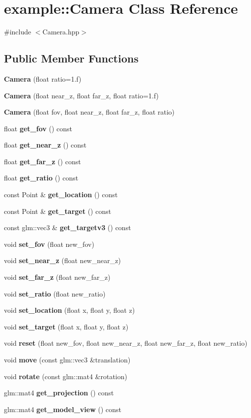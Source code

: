 \section{example\+::Camera Class Reference}
\label{classexample_1_1_camera}


{\ttfamily \#include $<$Camera.\+hpp$>$}

\subsection*{Public Member Functions}
\begin{DoxyCompactItemize}
\item 
\textbf{ Camera} (float ratio=1.f)
\item 
\textbf{ Camera} (float near\+\_\+z, float far\+\_\+z, float ratio=1.f)
\item 
\textbf{ Camera} (float fov, float near\+\_\+z, float far\+\_\+z, float ratio)
\item 
float \textbf{ get\+\_\+fov} () const
\item 
float \textbf{ get\+\_\+near\+\_\+z} () const
\item 
float \textbf{ get\+\_\+far\+\_\+z} () const
\item 
float \textbf{ get\+\_\+ratio} () const
\item 
const Point \& \textbf{ get\+\_\+location} () const
\item 
const Point \& \textbf{ get\+\_\+target} () const
\item 
const glm\+::vec3 \& \textbf{ get\+\_\+targetv3} () const
\item 
void \textbf{ set\+\_\+fov} (float new\+\_\+fov)
\item 
void \textbf{ set\+\_\+near\+\_\+z} (float new\+\_\+near\+\_\+z)
\item 
void \textbf{ set\+\_\+far\+\_\+z} (float new\+\_\+far\+\_\+z)
\item 
void \textbf{ set\+\_\+ratio} (float new\+\_\+ratio)
\item 
void \textbf{ set\+\_\+location} (float x, float y, float z)
\item 
void \textbf{ set\+\_\+target} (float x, float y, float z)
\item 
void \textbf{ reset} (float new\+\_\+fov, float new\+\_\+near\+\_\+z, float new\+\_\+far\+\_\+z, float new\+\_\+ratio)
\item 
void \textbf{ move} (const glm\+::vec3 \&translation)
\item 
void \textbf{ rotate} (const glm\+::mat4 \&rotation)
\item 
glm\+::mat4 \textbf{ get\+\_\+projection} () const
\item 
glm\+::mat4 \textbf{ get\+\_\+model\+\_\+view} () const
\end{DoxyCompactItemize}



